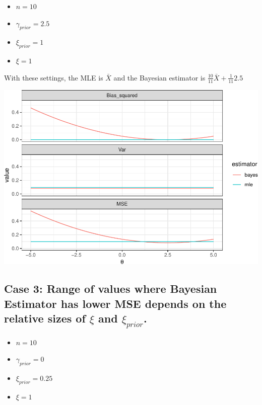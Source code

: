 \documentclass[]{article}
\providecommand{\tightlist}{%
  \setlength{\itemsep}{0pt}\setlength{\parskip}{0pt}}
\begin{document}
\begin{itemize}
\tightlist
\item
  \(n = 10\)
\item
  \(\gamma_{prior} = 2.5\)
\item
  \(\xi_{prior} = 1\)
\item
  \(\xi = 1\)
\end{itemize}

With these settings, the MLE is \(\bar{X}\) and the Bayesian estimator
is \(\frac{10}{11} \bar{X} + \frac{1}{11}2.5\)

\includegraphics{20190426_normal_univar_bayes_files/figure-latex/unnamed-chunk-2-1.pdf}

\newpage

\subsection{\texorpdfstring{Case 3: Range of values where Bayesian
Estimator has lower MSE depends on the relative sizes of \(\xi\) and
\(\xi_{prior}\).}{Case 3: Range of values where Bayesian Estimator has lower MSE depends on the relative sizes of \textbackslash{}xi and \textbackslash{}xi\_\{prior\}.}}\label{case-3-range-of-values-where-bayesian-estimator-has-lower-mse-depends-on-the-relative-sizes-of-xi-and-xi_prior.}

\begin{itemize}
\tightlist
\item
  \(n = 10\)
\item
  \(\gamma_{prior} = 0\)
\item
  \(\xi_{prior} = 0.25\)
\item
  \(\xi = 1\)
\end{itemize}
\end{document}
